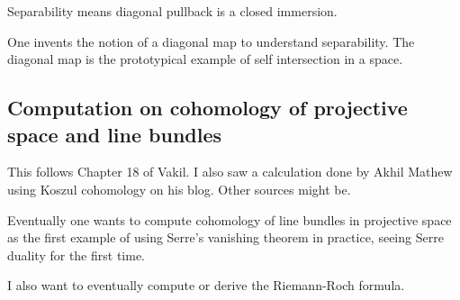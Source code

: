 Separability means diagonal pullback is a closed immersion.

One invents the notion of a diagonal map to understand separability. The diagonal map is the prototypical example of self intersection in a space.

\subsection{Computation on cohomology of projective space and line bundles}

This follows Chapter 18 of Vakil. I also saw a calculation done by Akhil Mathew using Koszul cohomology on his blog. Other sources might be.

Eventually one wants to compute cohomology of line bundles in projective space as the first example of using Serre's vanishing theorem in practice, seeing Serre duality for the first time.

I also want to eventually compute or derive the Riemann-Roch formula.